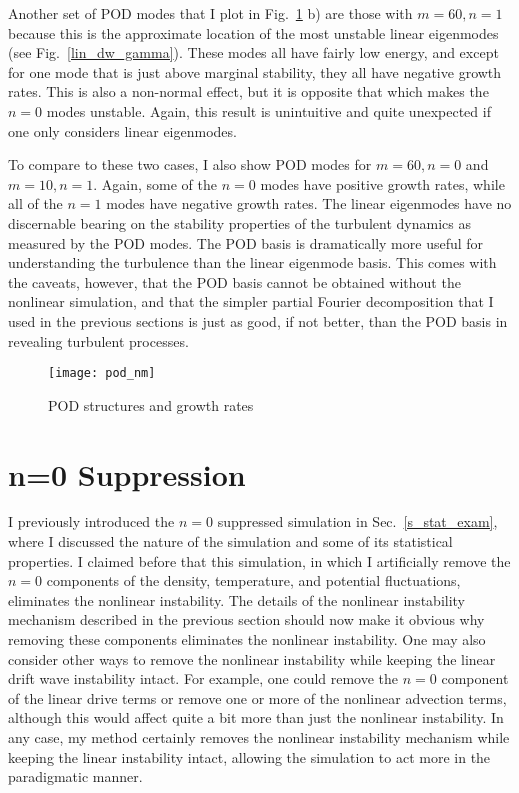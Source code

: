 Another set of POD modes that I plot in Fig.~\ref{pod_nm} b) are those with $m=60, n=1$ because this is the approximate location of the most unstable linear eigenmodes (see Fig.~\ref{lin_dw_gamma}).
These modes all have fairly low energy, and except for one mode that is just above marginal stability, they all have negative growth rates. 
This is also a non-normal effect, but it is opposite that which makes the $n=0$ modes unstable.
Again, this result is unintuitive and quite unexpected if one only considers linear eigenmodes.

To compare to these two cases, I also show POD modes for $m=60, n=0$ and $m=10, n=1$. Again, some of the $n=0$ modes have positive growth rates, while all of the $n=1$ modes have negative growth
rates. The linear eigenmodes have no discernable bearing on the stability properties of the turbulent dynamics as measured by the POD modes. The POD basis is dramatically more useful for
understanding the turbulence than the linear eigenmode basis. This comes with the caveats, however, that the POD basis cannot be obtained without the nonlinear simulation, and that the simpler
partial Fourier decomposition that I used in the previous sections is just as good, if not better, than the POD basis in revealing turbulent processes.

\begin{figure}[!ht]
\centerline{\texttt{[image: pod\_nm]}}
\caption{POD structures and growth rates}
\label{pod_nm}
\end{figure}


\section{n=0 Suppression}
\label{ss_n0_supp}

I previously introduced the $n=0$ suppressed simulation in Sec.~\ref{s_stat_exam}, where I discussed the nature of the simulation and some of its statistical properties. I claimed before that
this simulation, in which I artificially remove the $n=0$ components of the density, temperature, and potential fluctuations, eliminates the nonlinear instability.
The details of the nonlinear instability mechanism described in the previous section should now make it obvious why removing these components eliminates the nonlinear instability.
One may also consider other ways to remove the nonlinear instability while keeping the linear drift wave instability intact. For example, one could remove the $n=0$ component of the linear
drive terms or remove one or more of the nonlinear advection terms, although this would affect quite a bit more than just the nonlinear instability. In any case, my method
certainly removes the nonlinear instability mechanism while keeping the linear instability intact, allowing the simulation to act more in the paradigmatic manner.

